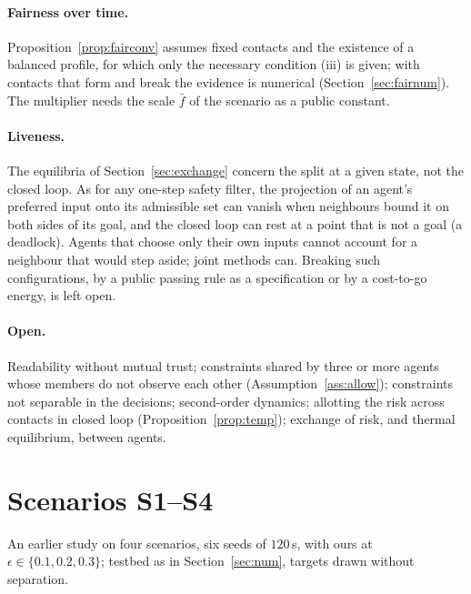 \documentclass[11pt]{article}
\theoremstyle{definition}
\theoremstyle{remark}
\begin{document}
\paragraph{Fairness over time.} Proposition~\ref{prop:fairconv} assumes fixed contacts and the existence of a balanced profile, for which only the necessary condition (iii) is given; with contacts that form and break the evidence is numerical (Section~\ref{sec:fairnum}). The multiplier needs the scale $\bar f$ of the scenario as a public constant.

\paragraph{Liveness.} The equilibria of Section~\ref{sec:exchange} concern the split at a given state, not the closed loop. As for any one-step safety filter, the projection of an agent's preferred input onto its admissible set can vanish when neighbours bound it on both sides of its goal, and the closed loop can rest at a point that is not a goal (a deadlock). Agents that choose only their own inputs cannot account for a neighbour that would step aside; joint methods can. Breaking such configurations, by a public passing rule as a specification or by a cost-to-go energy, is left open.

\paragraph{Open.} Readability without mutual trust; constraints shared by three or more agents whose members do not observe each other (Assumption~\ref{ass:allow}); constraints not separable in the decisions; second-order dynamics; allotting the risk across contacts in closed loop (Proposition~\ref{prop:temp}); exchange of risk, and thermal equilibrium, between agents.

\appendix
\section{Scenarios S1--S4}\label{app:s14}
An earlier study on four scenarios, six seeds of $120$\,s, with ours at $\epsilon\in\{0.1,0.2,0.3\}$; testbed as in Section~\ref{sec:num}, targets drawn without separation.
\end{document}
